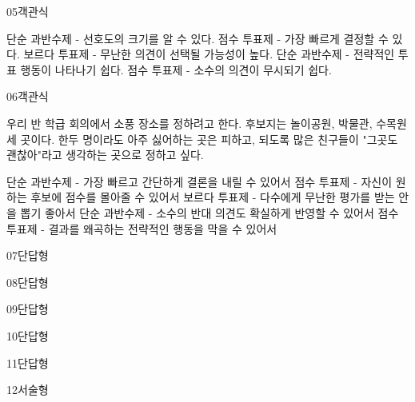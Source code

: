 \documentclass[fs85,seriesRus]{korfarm-base}
\begin{document}
\begin{kfQBlock}{05}{객관식}
\begin{kfChoices}
\kfChoice 단순 과반수제 - 선호도의 크기를 알 수 있다.
\kfChoice 점수 투표제 - 가장 빠르게 결정할 수 있다.
\kfChoice 보르다 투표제 - 무난한 의견이 선택될 가능성이 높다.
\kfChoice 단순 과반수제 - 전략적인 투표 행동이 나타나기 쉽다.
\kfChoice 점수 투표제 - 소수의 의견이 무시되기 쉽다.
\end{kfChoices}
\end{kfQBlock}
\begin{kfQBlock}{06}{객관식}
\begin{kfEvidence}우리 반 학급 회의에서 소풍 장소를 정하려고 한다. 후보지는 놀이공원, 박물관, 수목원 세 곳이다. 한두 명이라도 아주 싫어하는 곳은 피하고, 되도록 많은 친구들이 "그곳도 괜찮아"라고 생각하는 곳으로 정하고 싶다.\end{kfEvidence}
\begin{kfChoices}
\kfChoice 단순 과반수제 - 가장 빠르고 간단하게 결론을 내릴 수 있어서
\kfChoice 점수 투표제 - 자신이 원하는 후보에 점수를 몰아줄 수 있어서
\kfChoice 보르다 투표제 - 다수에게 무난한 평가를 받는 안을 뽑기 좋아서
\kfChoice 단순 과반수제 - 소수의 반대 의견도 확실하게 반영할 수 있어서
\kfChoice 점수 투표제 - 결과를 왜곡하는 전략적인 행동을 막을 수 있어서
\end{kfChoices}
\end{kfQBlock}
\begin{kfQBlock}{07}{단답형}
\end{kfQBlock}
\begin{kfQBlock}{08}{단답형}
\end{kfQBlock}
\begin{kfQBlock}{09}{단답형}
\end{kfQBlock}
\begin{kfQBlock}{10}{단답형}
\end{kfQBlock}
\begin{kfQBlock}{11}{단답형}
\end{kfQBlock}
\begin{kfQBlock}{12}{서술형}
\end{kfQBlock}
\kfEndMC
\end{document}
